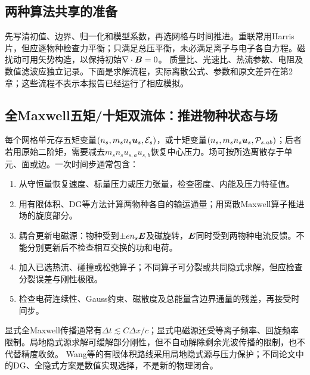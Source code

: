 \subsection{两种算法共享的准备}
先写清初值、边界、归一化和模型系数，再选网格与时间推进。重联常用Harris片，但应逐物种检查力平衡；只满足总压平衡，未必满足离子与电子各自方程。磁扰动可用矢势构造，以保持初始$\nabla\cdot\bm{B}=0$。
质量比、光速比、热流参数、电阻及数值滤波应独立记录。下面是求解流程，实际离散公式、参数和原文差异在第2章；这些流程不表示本报告已经运行了相应模拟。\citep{Birn2001,Wang2015}

\subsection{全Maxwell五矩/十矩双流体：推进物种状态与场}
每个网格单元存五矩变量$(n_s,m_sn_s\bm{u}_s,\mathcal E_s)$，或十矩变量$(n_s,m_sn_s\bm{u}_s,\mathcal P_{s,ab})$；后者若用原始二阶矩，需要减去$m_sn_su_{s,a}u_{s,b}$恢复中心压力。场可按所选离散存于单元、面或边。一次时间步通常包含：
\begin{enumerate}
\item 从守恒量恢复速度、标量压力或压力张量，检查密度、内能及压力特征值。
\item 用有限体积、DG等方法计算两物种各自的输运通量；用离散Maxwell算子推进场的旋度部分。
\item 耦合更新电磁源：物种受到$\pm en_s\bm{E}$及磁旋转，$\bm{E}$同时受到两物种电流反馈。不能分别更新后不检查相互交换的功和电荷。
\item 加入已选热流、碰撞或松弛算子；不同算子可分裂或共同隐式求解，但应检查分裂误差与刚性极限。
\item 检查电荷连续性、Gauss约束、磁散度及总能量含边界通量的残差，再接受时间步。
\end{enumerate}
显式全Maxwell传播通常有$\Delta t\lesssim C\Delta x/c$；显式电磁源还受等离子频率、回旋频率限制。局地隐式源求解可缓解部分刚性，但不自动解除剩余光波传播的限制，也不代替精度收敛。
Wang等的有限体积路线采用局地隐式源与压力保护；不同论文中的DG、全隐式方案是数值实现选择，不是新的物理闭合。\citep{Wang2015,Hakim2008}

